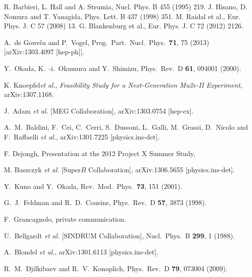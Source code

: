 \begin{thebibliography}{9}

  R. Barbieri, L. Hall and A. Strumia, Nucl. Phys. B 455
(1995) 219.
J. Hisano, D. Nomura and T. Yanagida, Phys. Lett.
B 437 (1998) 351.
M. Raidal et al., Eur. Phys. J. C 57 (2008) 13.
G. Blankenburg et al., Eur. Phys. J. C 72 (2012) 2126.

  A.~de Gouv{\^e}a and P.~Vogel,
  Prog.\ Part.\ Nucl.\ Phys.\  {\bf 71}, 75 (2013)
  [arXiv:1303.4097 [hep-ph]].
  
   Y.~Okada, K.~-i.~Okumura and Y.~Shimizu, Phys.\ Rev.\ D {\bf 61}, 094001 (2000).
  
K. Knoepfel{\it  et al.},  {\it{Feasibility Study for a Next-Generation Mu2e-II Experiment}}, arXiv:1307.1168.

 J.~Adam {\it et al.}  [MEG Collaboration],
  arXiv:1303.0754 [hep-ex].

 A.~M.~Baldini, F.~Cei, C.~Cerri, S.~Dussoni, L.~Galli, M.~Grassi, D.~Nicolo and F.~Raffaelli {\it et al.},
  arXiv:1301.7225 [physics.ins-det].

F. Dejongh, Presentation at the 2012 Project X Summer Study,
\hfill{}


M. Baszczyk {\it et al.} [Super$B$ Collaboration],
arXiv:1306.5655 [physics.ins-det].

 Y.~Kuno and Y.~Okada, Rev.\ Mod.\ Phys.\  {\bf 73}, 151 (2001).

  G.~J.~Feldman and R.~D.~Cousins,
  Phys.\ Rev.\ D {\bf 57}, 3873 (1998).
  
 F.~Grancagnolo, private communication.

  U.~Bellgardt {\it et al.}  [SINDRUM Collaboration], Nucl.\ Phys.\ B {\bf 299}, 1 (1988).

 A.~Blondel {\it et al.}, arXiv:1301.6113 [physics.ins-det].


 R.~M.~Djilkibaev and R.~V.~Konoplich, Phys.\ Rev.\ D {\bf 79}, 073004 (2009).

\end{thebibliography}
